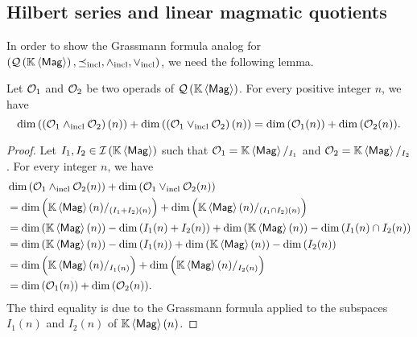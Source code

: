 \subsection{Hilbert series and linear magmatic quotients}
In order to show the Grassmann formula analog for $\left(\mathcal{Q}\left(\mathbb{K} \left\langle\mathsf{Mag}\right\rangle\right),\preceq_{\mathrm{incl}},\wedge_{\mathrm{incl}},\vee_{\mathrm{incl}}\right)$, we need the
following lemma.
\medbreak

\begin{Lemma}
    \label{lem:lattice_structure_and_coefficients_of_Hiblert_series}
    Let $\mathcal{O}_1$ and $\mathcal{O}_2$ be two operads of $\mathcal{Q}\left(\mathbb{K} \left\langle\mathsf{Mag}\right\rangle\right)$. For every
    positive integer $n$, we have
    \begin{equation}
    \label{equ:lattice_structure_and_coefficients_of_the_Hiblert_series}
        \dim{\left(\left(\Oca_1\InfQMag\Oca_2\right)(n)\right)}+
        \dim{\left(\left(\Oca_1\SupQMag\Oca_2\right)(n)\right)}=
        \dim{\left(\Oca_1(n)\right)}+\dim{\left(\Oca_2(n)\right)}.
    \end{equation}
\end{Lemma}
\begin{proof}
    Let $I_1, I_2 \in \mathcal{I}\left(\mathbb{K} \left\langle\mathsf{Mag}\right\rangle\right)$ such that $\mathcal{O}_1 = \mathbb{K} \left\langle\mathsf{Mag}\right\rangle/_{I_1}$ and
    $\mathcal{O}_2 = \mathbb{K} \left\langle\mathsf{Mag}\right\rangle/_{I_2}$. For every integer $n$, we have
    \begin{equation}\begin{split}
        &\dim{\left(\mathcal{O}_1\wedge_{\mathrm{incl}}\mathcal{O}_2(n)\right)}+
            \dim{\left(\mathcal{O}_1\vee_{\mathrm{incl}}\mathcal{O}_2(n)\right)}\\
        &=\dim{\Big(\mathbb{K}\left\langle\mathsf{Mag}\right\rangle(n)/_{\left(I_1+I_2\right)(n)}\Big)}+
            \dim{\Big(\mathbb{K}\left\langle\mathsf{Mag}\right\rangle(n)/_{\left(I_1\cap I_2\right)(n)}\Big)}\\
        &=\dim{\left(\mathbb{K}\left\langle\mathsf{Mag}\right\rangle(n)\right)}-\dim{\left(I_1(n)+I_2(n)\right)}
            +\dim{\left(\mathbb{K}\left\langle\mathsf{Mag}\right\rangle(n)\right)}
            -\dim{\left(I_1(n)\cap I_2(n)\right)} \\
        &=\dim{\left(\mathbb{K}\left\langle\mathsf{Mag}\right\rangle(n)\right)}-\dim{\left(I_1(n)\right)}
            + \dim{\left(\mathbb{K}\left\langle\mathsf{Mag}\right\rangle(n)\right)}-\dim{\left(I_2(n)\right)}\\
        &=\dim{\Big(\mathbb{K}\left\langle\mathsf{Mag}\right\rangle(n)/_{I_1(n)}\Big)}
            +\dim{\Big(\mathbb{K}\left\langle\mathsf{Mag}\right\rangle(n)/_{I_2(n)}\Big)}\\
        &=\dim{\left(\mathcal{O}_1(n)\right)}+\dim{\left(\mathcal{O}_2(n)\right)}.
    \end{split}\end{equation}
    The third equality is due to the Grassmann formula applied to the
    subspaces $I_1(n)$ and $I_2(n)$ of $\mathbb{K} \left\langle\mathsf{Mag}\right\rangle(n)$.
\end{proof}
\medbreak

